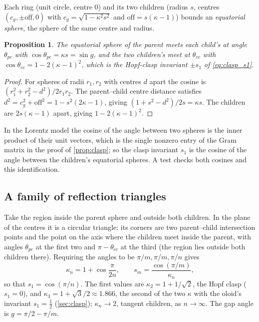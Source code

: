 \documentclass[11pt,a4paper]{article}
\newtheorem{proposition}{Proposition}
\theoremstyle{remark}
\begin{document}
Each ring (unit circle, centre $0$) and its two children (radius $s$, centres $(c_g,\pm\mathrm{off},0)$ with $c_g=\sqrt{1-\kappa^2s^2}$ and $\mathrm{off}=s(\kappa-1)$) bounds an \emph{equatorial sphere}, the sphere of the same centre and radius.

\begin{proposition}\label{prop:angles}
The equatorial sphere of the parent meets each child's at angle $\theta_{pc}$ with $\cos\theta_{pc}=\kappa s=\sin g$, and the two children's meet at $\theta_{cc}$ with $\cos\theta_{cc}=1-2(\kappa-1)^2$, which is the Hopf-clasp invariant $\pm s_1$ of \cref{eq:clasp_s1}.
\end{proposition}
\begin{proof}
For spheres of radii $r_1,r_2$ with centres $d$ apart the cosine is $(r_1^2+r_2^2-d^2)/2r_1r_2$.  The parent--child centre distance satisfies $d^2=c_g^2+\mathrm{off}^2=1-s^2(2\kappa-1)$, giving $(1+s^2-d^2)/2s=\kappa s$.  The children are $2s(\kappa-1)$ apart, giving $1-2(\kappa-1)^2$.
\end{proof}
In the Lorentz model the cosine of the angle between two spheres is the inner product of their unit vectors, which is the single nonzero entry of the Gram matrix in the proof of \cref{prop:clasp}; so the clasp invariant $s_1$ is the cosine of the angle between the children's equatorial spheres.  A test checks both cosines and this identification.

\subsection{A family of reflection triangles}

Take the region inside the parent sphere and outside both children.  In the plane of the centres it is a circular triangle: its corners are two parent--child intersection points and the point on the axis where the children meet inside the parent, with angles $\theta_{pc}$ at the first two and $\pi-\theta_{cc}$ at the third (the region lies outside both children there).  Requiring the angles to be $\pi/m,\pi/m,\pi/n$ gives
\begin{equation}
\kappa_n=1+\cos\frac{\pi}{2n},\qquad s_{m}=\frac{\cos(\pi/m)}{\kappa_n},
\label{eq:coxeter}
\end{equation}
so that $s_1=\cos(\pi/n)$.  The first values are $\kappa_2=1+1/\sqrt2$, the Hopf clasp ($s_1=0$), and $\kappa_3=1+\sqrt3/2\approx1.866$, the second of the two $\kappa$ with the oloid's invariant $s_1=\tfrac12$ (\cref{sec:clasp}); $\kappa_n\to2$, tangent children, as $n\to\infty$.  The gap angle is $g=\pi/2-\pi/m$.
\end{document}
